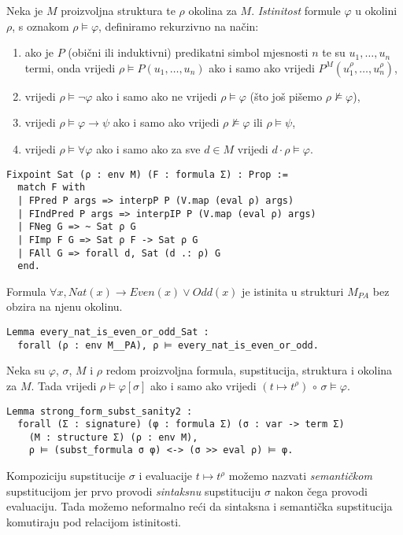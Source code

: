 \begin{definition}
  Neka je \(M\) proizvoljna struktura te \(\rho\) okolina za \(M\).
  \textit{Istinitost} formule \(\varphi\) u okolini \(\rho\), s oznakom \(\rho \vDash \varphi\),
  definiramo rekurzivno na način:
  \begin{enumerate}
  \item ako je \(P\) (obični ili induktivni) predikatni simbol mjesnosti \(n\)
    te su \(u_{1}, \ldots, u_{n}\) termi,
    onda vrijedi \(\rho \vDash P(u_{1}, \ldots, u_{n})\) ako i samo ako vrijedi \(P^{M}(u_{1}^{\rho}, \ldots, u_{n}^{\rho})\),
  \item vrijedi \(\rho \vDash \neg \varphi \) ako i samo ako ne vrijedi \(\rho \vDash \varphi\) (što još pišemo \(\rho \not \vDash \varphi\)),
  \item vrijedi \(\rho \vDash \varphi \rightarrow \psi \) ako i samo ako vrijedi \(\rho \not \vDash \varphi\) ili \(\rho \vDash \psi\),
  \item vrijedi \(\rho \vDash \forall \varphi\) ako i samo ako za sve \(d \in M\) vrijedi \(d \cdot \rho \vDash \varphi\).
  \end{enumerate}
\begin{verbatim}
Fixpoint Sat (ρ : env M) (F : formula Σ) : Prop :=
  match F with
  | FPred P args => interpP P (V.map (eval ρ) args)
  | FIndPred P args => interpIP P (V.map (eval ρ) args)
  | FNeg G => ~ Sat ρ G
  | FImp F G => Sat ρ F -> Sat ρ G
  | FAll G => forall d, Sat (d .: ρ) G
  end.
\end{verbatim}
\end{definition}

\begin{example}
  Formula \(\forall x, \mathit{Nat}(x) \rightarrow \mathit{Even}(x) \lor \mathit{Odd}(x)\) je istinita u strukturi \(M_{\mathit{PA}}\)
  bez obzira na njenu okolinu.
\begin{verbatim}
Lemma every_nat_is_even_or_odd_Sat :
  forall (ρ : env M__PA), ρ ⊨ every_nat_is_even_or_odd.
\end{verbatim}
\end{example}

\begin{lemma}
  Neka su \(\varphi\), \(\sigma\), \(M\) i \(\rho\) redom
  proizvoljna formula, supstitucija, struktura i okolina za \(M\).
  Tada vrijedi \(\rho \vDash \varphi[\sigma]\) ako i samo ako vrijedi \( (t \mapsto t^{\rho}) \, \circ \, \sigma \vDash \varphi\).
\begin{verbatim}
Lemma strong_form_subst_sanity2 :
  forall (Σ : signature) (φ : formula Σ) (σ : var -> term Σ)
    (M : structure Σ) (ρ : env M),
    ρ ⊨ (subst_formula σ φ) <-> (σ >> eval ρ) ⊨ φ.
\end{verbatim}
  \noindent Kompoziciju supstitucije \(\sigma\) i evaluacije \(t \mapsto t^{\rho}\)
  možemo nazvati \textit{semantičkom} supstitucijom
  jer prvo provodi \textit{sintaksnu} supstituciju \(\sigma\) nakon čega provodi evaluaciju.
  Tada možemo neformalno reći da sintaksna i semantička supstitucija
  komutiraju pod relacijom istinitosti.
\end{lemma}

